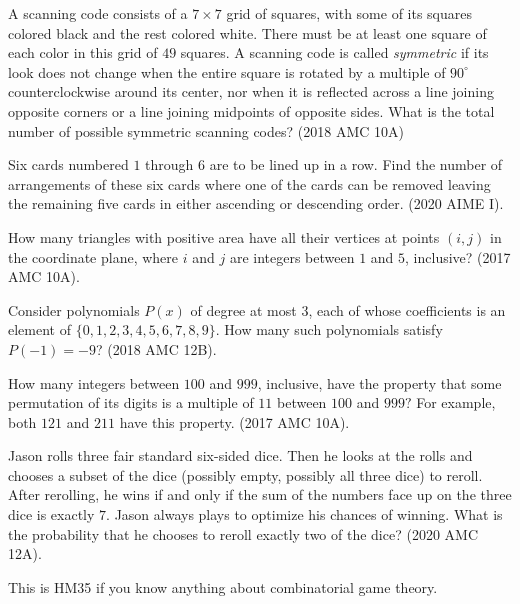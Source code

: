 \documentclass[11pt]{article}
\begin{document}
\begin{problem}[30]
    A scanning code consists of a $7 \times 7$ grid of squares, with some of its squares colored black and the rest colored white. There must be at least one square of each color in this grid of $49$ squares. A scanning code is called \textit{symmetric} if its look does not change when the entire square is rotated by a multiple of $90 ^{\circ}$ counterclockwise around its center, nor when it is reflected across a line joining opposite corners or a line joining midpoints of opposite sides. What is the total number of possible symmetric scanning codes? (2018 AMC 10A)
\end{problem}
\begin{problem}[30]
    Six cards numbered $1$ through $6$ are to be lined up in a row. Find the number of arrangements of these six cards where one of the cards can be removed leaving the remaining five cards in either ascending or descending order. (2020 AIME I).
\end{problem}
\begin{problem}[35]
    How many triangles with positive area have all their vertices at points $(i,j)$ in the coordinate plane, where $i$ and $j$ are integers between $1$ and $5$, inclusive? (2017 AMC 10A).
\end{problem}
\begin{problem}[HM35]
    Consider polynomials $P(x)$ of degree at most $3$, each of whose coefficients is an element of $\{0, 1, 2, 3, 4, 5, 6, 7, 8, 9\}$. How many such polynomials satisfy $P(-1) = -9$? (2018 AMC 12B).
\end{problem}
\begin{problem}[35]
    How many integers between $100$ and $999$, inclusive, have the property that some permutation of its digits is a multiple of $11$ between $100$ and $999?$ For example, both $121$ and $211$ have this property. (2017 AMC 10A).
\end{problem}
\begin{problem}[40 (HM35)]
    Jason rolls three fair standard six-sided dice. Then he looks at the rolls and chooses a subset of the dice (possibly empty, possibly all three dice) to reroll. After rerolling, he wins if and only if the sum of the numbers face up on the three dice is exactly $7.$ Jason always plays to optimize his chances of winning. What is the probability that he chooses to reroll exactly two of the dice? (2020 AMC 12A).
    \begin{remark}
        This is HM35 if you know anything about combinatorial game theory.
    \end{remark}
\end{problem}
\end{document}
